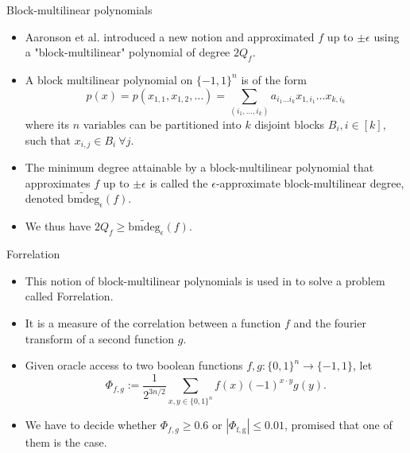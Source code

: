 \documentclass[10pt]{beamer}
\newcommand{\bmdeg}{\mathrm{bmdeg}}
\begin{document}
\begin{frame}{Block-multilinear polynomials}
\begin{itemize}
    \item Aaronson et al. \cite{paper1} introduced a new notion and approximated $f$ up to $\pm \epsilon$ using a "block-multilinear" polynomial of degree $2Q_f$.
    \item A block multilinear polynomial on $\{-1,1\}^n$ is of the form $$p(x) = p(x_{1,1}, x_{1,2}, \ldots) = \sum_{(i_1, \ldots, i_k)} a_{i_1 \ldots i_k} x_{1,i_1} \ldots x_{k,i_k}$$ where its $n$ variables can be partitioned into $k$ disjoint blocks $B_i, i \in [k]$, such that $x_{i,j} \in B_i\ \forall j$.
    \item The minimum degree attainable by a block-multilinear polynomial that approximates $f$ up to $\pm \epsilon$ is called the $\epsilon$-approximate block-multilinear degree, denoted $\widetilde{\bmdeg}_\epsilon(f)$.
    \item We thus have $2Q_f \geq \widetilde{\bmdeg}_\epsilon(f)$.
\end{itemize}
\end{frame}

\begin{frame}{Forrelation}
\begin{itemize}
    \item This notion of block-multilinear polynomials is used in \cite{paper1} to solve a problem called Forrelation.
    \item It is a measure of the correlation between a function $f$ and the fourier transform of a second function $g$.
    \item Given oracle access to two boolean functions $f,g\colon \{0,1\}^{n} \rightarrow  \{-1,1\}$, let
    \begin{equation*}
    \Phi_{f, g} := \frac{1}{2^{3n/2}} \sum_{x, y \in \{0,1\}^{n}} f(x)(-1)^{x \cdot y} g(y).
    \end{equation*}
    \item We have to decide whether $\Phi_{f,g} \geq 0.6$ or $\left|\Phi_{\mathrm{f}, \mathrm{g}}\right| \leq 0.01$, promised that one of them is the case.
\end{itemize} 
\end{frame}
\end{document}
